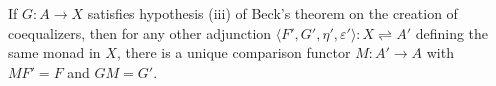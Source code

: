 If $G : A \to X$ satisfies hypothesis (iii) of Beck's theorem on the creation of coequalizers, then for any other adjunction $\langle F', G', \eta', \varepsilon' \rangle : X \rightleftharpoons A'$ defining the same monad in $X$, there is a unique comparison functor $M : A' \to A$ with $M F' = F$ and $G M = G'$.
